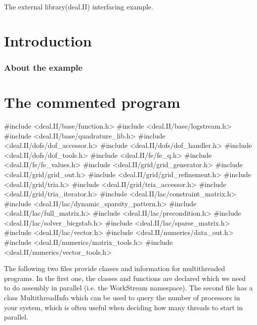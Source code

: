 The external library(deal.\+II) interfacing example.

 \label{_Intro}%
 \label{_Introduction}%
\section*{Introduction}

\label{_Abouttheexample}%
\subsubsection*{About the example }

\label{_CommProg}%
 \section*{The commented program}


\begin{DoxyCode}
\textcolor{preprocessor}{#include <deal.II/base/function.h>}
\textcolor{preprocessor}{#include <deal.II/base/logstream.h>}
\textcolor{preprocessor}{#include <deal.II/base/quadrature\_lib.h>}
\textcolor{preprocessor}{#include <deal.II/dofs/dof\_accessor.h>}
\textcolor{preprocessor}{#include <deal.II/dofs/dof\_handler.h>}
\textcolor{preprocessor}{#include <deal.II/dofs/dof\_tools.h>}
\textcolor{preprocessor}{#include <deal.II/fe/fe\_q.h>}
\textcolor{preprocessor}{#include <deal.II/fe/fe\_values.h>}
\textcolor{preprocessor}{#include <deal.II/grid/grid\_generator.h>}
\textcolor{preprocessor}{#include <deal.II/grid/grid\_out.h>}
\textcolor{preprocessor}{#include <deal.II/grid/grid\_refinement.h>}
\textcolor{preprocessor}{#include <deal.II/grid/tria.h>}
\textcolor{preprocessor}{#include <deal.II/grid/tria\_accessor.h>}
\textcolor{preprocessor}{#include <deal.II/grid/tria\_iterator.h>}
\textcolor{preprocessor}{#include <deal.II/lac/constraint\_matrix.h>}
\textcolor{preprocessor}{#include <deal.II/lac/dynamic\_sparsity\_pattern.h>}
\textcolor{preprocessor}{#include <deal.II/lac/full\_matrix.h>}
\textcolor{preprocessor}{#include <deal.II/lac/precondition.h>}
\textcolor{preprocessor}{#include <deal.II/lac/solver\_bicgstab.h>}
\textcolor{preprocessor}{#include <deal.II/lac/sparse\_matrix.h>}
\textcolor{preprocessor}{#include <deal.II/lac/vector.h>}
\textcolor{preprocessor}{#include <deal.II/numerics/data\_out.h>}
\textcolor{preprocessor}{#include <deal.II/numerics/matrix\_tools.h>}
\textcolor{preprocessor}{#include <deal.II/numerics/vector\_tools.h>}
\end{DoxyCode}


The following two files provide classes and information for multithreaded programs. In the first one, the classes and functions are declared which we need to do assembly in parallel (i.\+e. the {\ttfamily Work\+Stream} namespace). The second file has a class Multithread\+Info which can be used to query the number of processors in your system, which is often useful when deciding how many threads to start in parallel.


